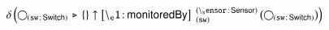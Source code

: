\documentclass[varwidth=100cm,convert={density=120}]{standalone}
\begin{document}
\begin{preview}
$\duplicateelimination \left(\getvertices{sw}{Switch} \antijoin \{\} \expandout{\backslash{}_e1}{monitoredBy}{sw}{\backslash{}_sensor}{Sensor} \left(\getvertices{sw}{Switch}\right)\right)$
\end{preview}
\end{document}
